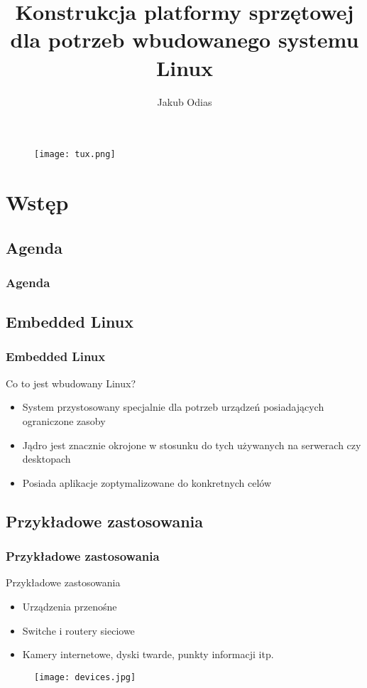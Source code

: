 \documentclass{beamer}
\newenvironment{ramka}{\begin{frame}}
{
		\end{frame}
}
\begin{document}
	\title[Embedded Linux]{Konstrukcja platformy sprzętowej dla potrzeb wbudowanego systemu Linux}
	\author{Jakub Odias}
	
	\begin{frame}
		\titlepage
		\begin{figure}[b]
			\texttt{[image: tux.png]} 
		\end{figure}
	\end{frame}
	
	\section{Wstęp}
	\subsection{Agenda}
	\begin{ramka}
		\frametitle{Agenda}
		\tableofcontents
	\end{ramka} 
	
	\subsection{Embedded Linux}
	\begin{ramka}
		\frametitle{Embedded Linux}
		\begin{block}{Co to jest wbudowany Linux?}
			\begin{itemize}
				\item<2-> System przystosowany specjalnie dla potrzeb urządzeń posiadających ograniczone zasoby
				\item<3-> Jądro jest znacznie okrojone w stosunku do tych używanych na serwerach czy desktopach
				\item<4-> Posiada aplikacje zoptymalizowane do konkretnych celów
			\end{itemize}
		\end{block}

	\end{ramka} 
	
	\subsection{Przykładowe zastosowania}
	\begin{ramka}
		\frametitle{Przykładowe zastosowania}
		\begin{block}{Przykładowe zastosowania}
		\begin{itemize}
				\item<2->Urządzenia przenośne
				\item<3-> Switche i routery sieciowe
				\item<4-> Kamery internetowe, dyski twarde, punkty informacji itp.
			\end{itemize}
			\begin{figure}[b]
		\texttt{[image: devices.jpg]} 
		\end{figure}
		\end{block}
	\end{ramka} 
	
\end{document}
